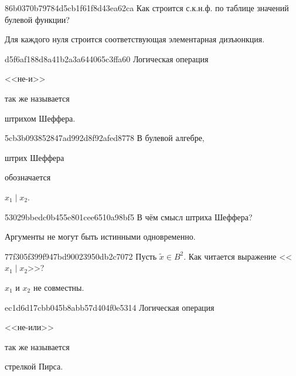 \begin{note}{86b0370b79784d5cb1f61f8d43ea62ca}
    Как строится с.к.н.ф. по таблице значений булевой функции?

    \begin{cloze}{1}
        Для каждого нуля строится соответствующая элементарная дизъюнкция.
   \end{cloze}
\end{note}

\begin{note}{d5f6af188d8a41b2a3a644065c3ffa60}
    Логическая операция \begin{icloze}{2}<<не-и>>\end{icloze} так же называется \begin{icloze}{1}штрихом Шеффера.\end{icloze}
\end{note}

\begin{note}{5cb3b093852847ad992d8f92afed8778}
    В булевой алгебре, \begin{icloze}{2}штрих Шеффера\end{icloze} обозначается \begin{icloze}{1}\({ x_1 \mid x_2 }\).\end{icloze}
\end{note}

\begin{note}{53029bbedc0b455e801cee6510a98bf5}
    В чём смысл штриха Шеффера?

    \begin{cloze}{1}
        Аргументы не могут быть истинными одновременно.
    \end{cloze}
\end{note}

\begin{note}{77f305f399f947bd90023950db2c7072}
    Пусть \({ \widetilde x \in B^2 }\).
    Как читается выражение <<\({ x_1 \mid x_2 }\)>>?

    \begin{cloze}{1}
        \({ x_1 }\) и \({ x_2 }\) не совместны.
    \end{cloze}
\end{note}

\begin{note}{ec1d6d17cbb045b8abb57d404f0e5314}
    Логическая операция \begin{icloze}{2}<<не-или>>\end{icloze} так же называется \begin{icloze}{1}стрелкой Пирса.\end{icloze}
\end{note}

